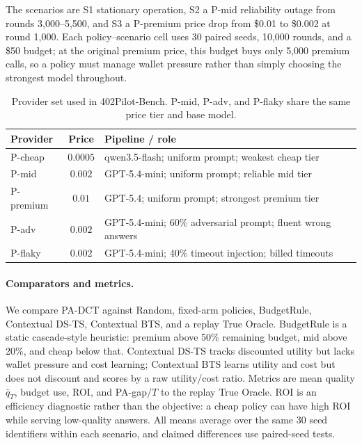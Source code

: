 \documentclass[sigconf, nonacm]{acmart}
\DeclareRobustCommand{\padct}{PA\nobreakdash-DCT}
\begin{document}
The scenarios are S1 stationary operation, S2 a P-mid reliability outage from rounds 3,000--5,500, and S3 a P-premium price drop from \$0.01 to \$0.002 at round 1,000. Each policy--scenario cell uses 30 paired seeds, 10,000 rounds, and a \$50 budget; at the original premium price, this budget buys only 5,000 premium calls, so a policy must manage wallet pressure rather than simply choosing the strongest model throughout.

\begin{table}[t]
\centering
\caption{Provider set used in 402Pilot-Bench. P-mid, P-adv, and P-flaky share the same price tier and base model.}
\label{tab:providers-short}
\footnotesize
\setlength{\tabcolsep}{2pt}
\begin{tabularx}{\linewidth}{@{}lcX@{}}
\toprule
Provider & Price & Pipeline / role \\
\midrule
P-cheap   & $0.0005$ & qwen3.5-flash; uniform prompt; weakest cheap tier \\
P-mid     & $0.002$  & GPT-5.4-mini; uniform prompt; reliable mid tier \\
P-premium & $0.01$   & GPT-5.4; uniform prompt; strongest premium tier \\
P-adv     & $0.002$  & GPT-5.4-mini; 60\% adversarial prompt; fluent wrong answers \\
P-flaky   & $0.002$  & GPT-5.4-mini; 40\% timeout injection; billed timeouts \\
\bottomrule
\end{tabularx}
\end{table}

\paragraph{Comparators and metrics.}
We compare \padct{} against Random, fixed-arm policies, BudgetRule, Contextual DS-TS, Contextual BTS, and a replay True Oracle. BudgetRule is a static cascade-style heuristic: premium above 50\% remaining budget, mid above 20\%, and cheap below that. Contextual DS-TS tracks discounted utility but lacks wallet pressure and cost learning; Contextual BTS learns utility and cost but does not discount and scores by a raw utility/cost ratio. Metrics are mean quality $\bar q_T$, budget use, ROI, and PA-gap/$T$ to the replay True Oracle. ROI is an efficiency diagnostic rather than the objective: a cheap policy can have high ROI while serving low-quality answers. All means average over the same 30 seed identifiers within each scenario, and claimed differences use paired-seed tests.
\end{document}
